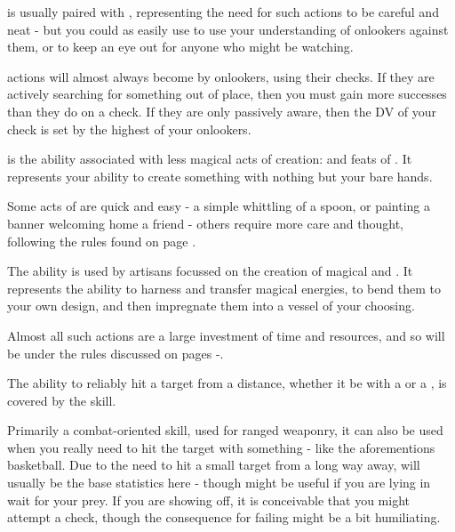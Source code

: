  is usually paired with , representing the need for such actions to be careful and neat - but you could as easily use  to use your understanding of onlookers against them, or  to keep an eye out for anyone who might be watching. 

 actions will almost always become  by onlookers, using their  checks. If they are actively searching for something out of place, then you must gain more successes than they do on a  check. If they are only passively aware, then the DV of your  check is set by the highest  of your onlookers.


 is the ability associated with less magical acts of creation:  and feats of . It represents your ability to create something with nothing but your bare hands. 

Some acts of  are quick and easy - a simple whittling of a spoon, or painting a banner welcoming home a friend - others require more care and thought, following the  rules found on page \pageref{S:ArtificingBasic}. 


The  ability is used by artisans focussed on the creation of magical  and . It represents the ability to harness and transfer magical energies, to bend them to your own design, and then impregnate them into a vessel of your choosing.

Almost all such actions are a large investment of time and resources, and so will be  under the rules discussed on pages \pageref{S:ArtificingBasic}-\pageref{S:ArtificingEnd}.


The ability to reliably hit a target from a distance, whether it be with a  or a , is covered by the  skill. 

Primarily a combat-oriented skill, used for ranged weaponry, it can also be used when you really need to hit the target with something - like the aforementions basketball. Due to the need to hit a small target from a long way away,  will usually be the base statistics here - though  might be useful if you are lying in wait for your prey. If you are showing off, it is conceivable that you might attempt a  check, though the consequence for failing might be a bit humiliating.

